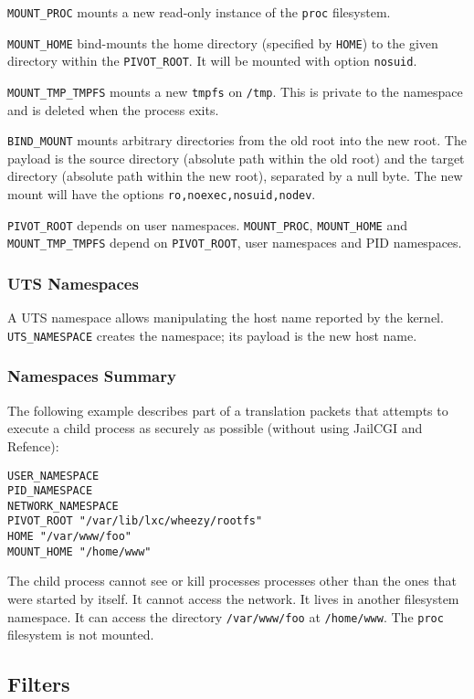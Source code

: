 \documentclass[a4paper,12pt]{article}
\begin{document}
\verb|MOUNT_PROC| mounts a new read-only instance of the \texttt{proc}
filesystem.

\verb|MOUNT_HOME| bind-mounts the home directory (specified by
\verb|HOME|) to the given directory within the \verb|PIVOT_ROOT|.  It
will be mounted with option \texttt{nosuid}.

\verb|MOUNT_TMP_TMPFS| mounts a new \texttt{tmpfs} on \texttt{/tmp}.
This is private to the namespace and is deleted when the process
exits.

\verb|BIND_MOUNT| mounts arbitrary directories from the old root into
the new root.  The payload is the source directory (absolute path
within the old root) and the target directory (absolute path within
the new root), separated by a null byte.  The new mount will have the
options \texttt{ro,noexec,nosuid,nodev}.

\verb|PIVOT_ROOT| depends on user namespaces.  \verb|MOUNT_PROC|,
\verb|MOUNT_HOME| and \verb|MOUNT_TMP_TMPFS| depend on
\verb|PIVOT_ROOT|, user namespaces and PID namespaces.

\subsubsection{UTS Namespaces}

A UTS namespace allows manipulating the host name reported by the
kernel.  \verb|UTS_NAMESPACE| creates the namespace; its payload is
the new host name.

\subsubsection{Namespaces Summary}

The following example describes part of a translation packets that
attempts to execute a child process as securely as possible (without
using JailCGI and Refence):

\begin{verbatim}
USER_NAMESPACE
PID_NAMESPACE
NETWORK_NAMESPACE
PIVOT_ROOT "/var/lib/lxc/wheezy/rootfs"
HOME "/var/www/foo"
MOUNT_HOME "/home/www"
\end{verbatim}

The child process cannot see or kill processes processes other than
the ones that were started by itself.  It cannot access the network.
It lives in another filesystem namespace.  It can access the directory
\texttt{/var/www/foo} at \texttt{/home/www}.  The \texttt{proc}
filesystem is not mounted.

\subsection{Filters}
\label{filter}
\end{document}
